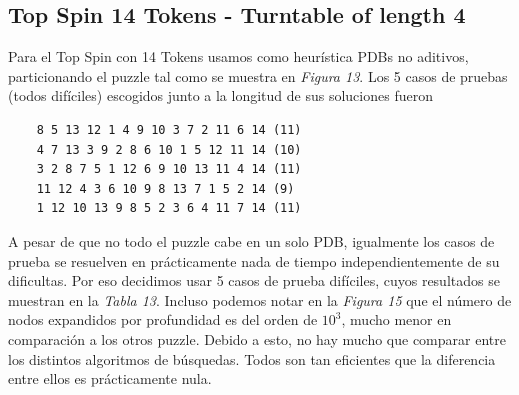 \documentclass[a4paper,10pt]{article}
\begin{document}
  \subsection{Top Spin 14 Tokens - Turntable of length 4}
    Para el Top Spin con 14 Tokens usamos como heur\'istica PDBs no aditivos, 
    particionando el puzzle tal como se muestra en \textit{Figura 13}. Los 5 casos de pruebas (todos dif\'iciles) escogidos junto a la 
    longitud de sus soluciones fueron
  
    \begin{verbatim}
    8 5 13 12 1 4 9 10 3 7 2 11 6 14 (11)
    4 7 13 3 9 2 8 6 10 1 5 12 11 14 (10)
    3 2 8 7 5 1 12 6 9 10 13 11 4 14 (11)
    11 12 4 3 6 10 9 8 13 7 1 5 2 14 (9)
    1 12 10 13 9 8 5 2 3 6 4 11 7 14 (11)
    \end{verbatim}
    
    A pesar de que no todo el puzzle cabe en un solo PDB, igualmente los
    casos de prueba se resuelven en pr\'acticamente nada de tiempo
    independientemente de su dificultas. Por eso decidimos usar 5
    casos de prueba dif\'iciles, cuyos resultados se muestran en la
    \textit{Tabla 13}. Incluso podemos notar en la \textit{Figura 15}
    que el n\'umero de nodos expandidos por profundidad es del orden
    de $10^3$, mucho menor en comparaci\'on a los otros puzzle. Debido
    a esto, no hay mucho que comparar entre los distintos algoritmos
    de b\'usquedas. Todos son tan eficientes que la diferencia entre 
    ellos es pr\'acticamente nula. 
    
\end{document}
